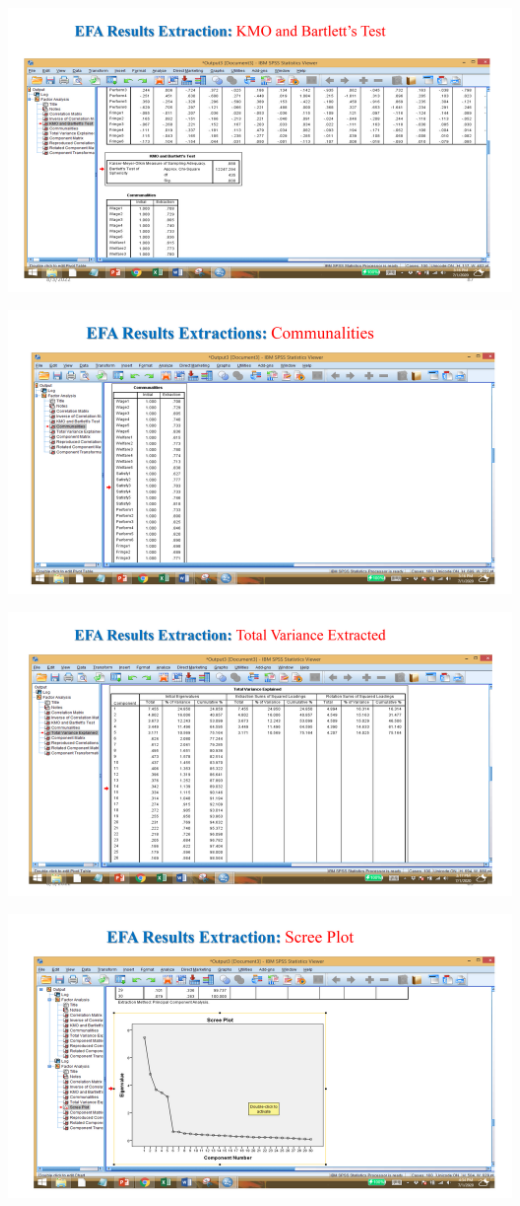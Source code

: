 \documentclass[
  letterpaper,
  DIV=11,
  numbers=noendperiod]{scrreprt}
\begin{document}
\includegraphics{images/slides/img_Page_076.png}

\includegraphics{images/slides/img_Page_077.png}

\includegraphics{images/slides/img_Page_078.png}

\includegraphics{images/slides/img_Page_079.png}
\end{document}
